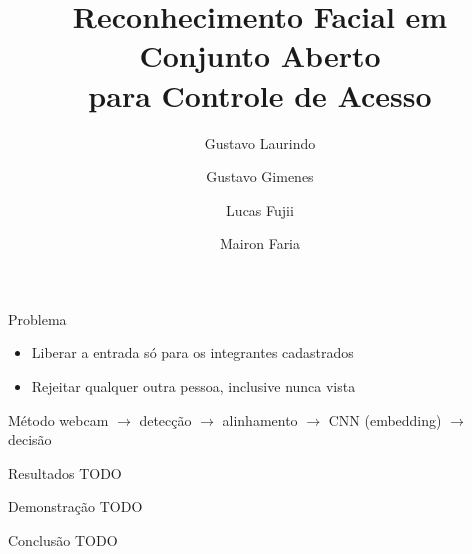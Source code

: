 \documentclass[aspectratio=169,11pt]{beamer}
\title{Reconhecimento Facial em Conjunto Aberto\\para Controle de Acesso}
\author{Gustavo Laurindo \and Gustavo Gimenes \and Lucas Fujii \and Mairon Faria}
\institute{Aprendizado de Máquina 2 -- UFSCar -- 2026/2}
\date{}
\begin{document}
\begin{frame}
\titlepage
\end{frame}

\begin{frame}{Problema}
\begin{itemize}
  \item Liberar a entrada só para os integrantes cadastrados
  \item Rejeitar qualquer outra pessoa, inclusive nunca vista
\end{itemize}
\end{frame}

\begin{frame}{Método}
webcam $\rightarrow$ detecção $\rightarrow$ alinhamento $\rightarrow$ CNN (embedding) $\rightarrow$ decisão
\end{frame}

\begin{frame}{Resultados}
TODO
\end{frame}

\begin{frame}{Demonstração}
TODO
\end{frame}

\begin{frame}{Conclusão}
TODO
\end{frame}
\end{document}
